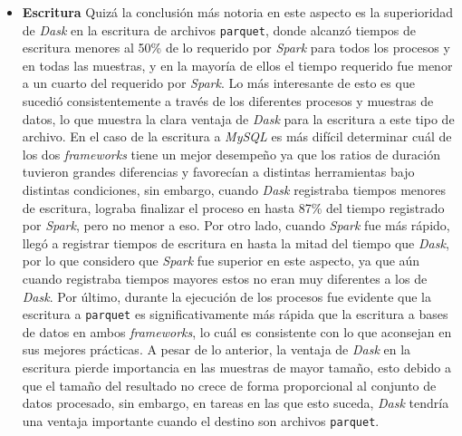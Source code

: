 \begin{itemize}
	\item \textbf{Escritura} Quizá la conclusión más notoria en este aspecto es la superioridad de \textit{Dask} en la escritura de archivos \texttt{parquet}, donde alcanzó tiempos de escritura menores al 50\% de lo requerido por \textit{Spark} para todos los procesos y en todas las muestras, y en la mayoría de ellos el tiempo requerido fue menor a un cuarto del requerido por \textit{Spark}. Lo más interesante de esto es que sucedió consistentemente a través de los diferentes procesos y muestras de datos, lo que muestra la clara ventaja de \textit{Dask} para la escritura a este tipo de archivo. En el caso de la escritura a \textit{MySQL} es más difícil determinar cuál de los dos \textit{frameworks} tiene un mejor desempeño ya que los ratios de duración tuvieron grandes diferencias y favorecían a distintas herramientas bajo distintas condiciones, sin embargo, cuando \textit{Dask} registraba tiempos menores de escritura, lograba finalizar el proceso en hasta 87\% del tiempo registrado por \textit{Spark}, pero no menor a eso. Por otro lado, cuando \textit{Spark} fue más rápido, llegó a registrar tiempos de escritura en hasta la mitad del tiempo que \textit{Dask}, por lo que considero que \textit{Spark} fue superior en este aspecto, ya que aún cuando registraba tiempos mayores estos no eran muy diferentes a los de \textit{Dask}. Por último, durante la ejecución de los procesos fue evidente que la escritura a \texttt{parquet} es significativamente más rápida que la escritura a bases de datos en ambos \textit{frameworks}, lo cuál es consistente con lo que aconsejan en sus mejores prácticas. A pesar de lo anterior, la ventaja de \textit{Dask} en la escritura pierde importancia en las muestras de mayor tamaño, esto debido a que el tamaño del resultado no crece de forma proporcional al conjunto de datos procesado, sin embargo, en tareas en las que esto suceda, \textit{Dask} tendría una ventaja importante cuando el destino son archivos \texttt{parquet}.
		

\end{itemize}
